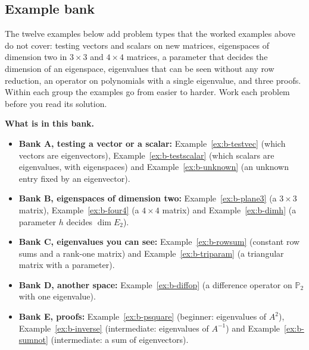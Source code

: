 \documentclass[11pt]{article}
\begin{document}
\subsection*{Example bank}
The twelve examples below add problem types that the worked examples above do not cover: testing vectors and scalars on new matrices, eigenspaces of dimension two in $3\times3$ and $4\times4$ matrices, a parameter that decides the dimension of an eigenspace, eigenvalues that can be seen without any row reduction, an operator on polynomials with a single eigenvalue, and three proofs. Within each group the examples go from easier to harder. Work each problem before you read its solution.

\textbf{What is in this bank.}
\begin{itemize}
  \item \textbf{Bank A, testing a vector or a scalar:} Example~\ref{ex:b-testvec} (which vectors are eigenvectors), Example~\ref{ex:b-testscalar} (which scalars are eigenvalues, with eigenspaces) and Example~\ref{ex:b-unknown} (an unknown entry fixed by an eigenvector).
  \item \textbf{Bank B, eigenspaces of dimension two:} Example~\ref{ex:b-plane3} (a $3\times3$ matrix), Example~\ref{ex:b-four4} (a $4\times4$ matrix) and Example~\ref{ex:b-dimh} (a parameter $h$ decides $\dim E_2$).
  \item \textbf{Bank C, eigenvalues you can see:} Example~\ref{ex:b-rowsum} (constant row sums and a rank-one matrix) and Example~\ref{ex:b-triparam} (a triangular matrix with a parameter).
  \item \textbf{Bank D, another space:} Example~\ref{ex:b-diffop} (a difference operator on $\mathbb{P}_2$ with one eigenvalue).
  \item \textbf{Bank E, proofs:} Example~\ref{ex:b-psquare} (beginner: eigenvalues of $A^2$), Example~\ref{ex:b-inverse} (intermediate: eigenvalues of $A^{-1}$) and Example~\ref{ex:b-sumnot} (intermediate: a sum of eigenvectors).
\end{itemize}
\end{document}
